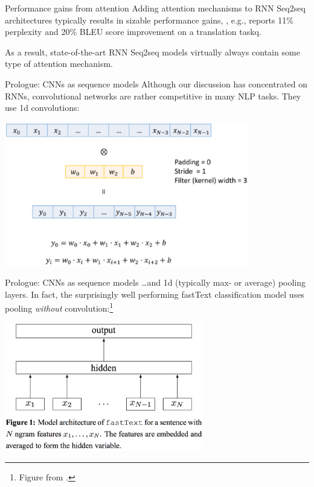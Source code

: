 \documentclass[style=upen, size=14pt]{powerdot}
\newcommand{\gold}{\color{arany}}
\theoremstyle{definition}
\begin{document}
\begin{slide}[toc=]{Performance gains from attention} Adding attention
  mechanisms to RNN Seq2seq architectures typically results in sizable
  performance gains, \citet[63]{luong2016neural}, e.g., reports 11\% perplexity
  and 20\% BLEU score improvement on a translation taskq.\bigskip

  As a result, state-of-the-art RNN Seq2seq models virtually always contain some
  type of attention mechanism.
\end{slide}

\begin{slide}[toc=CNNs]{Prologue: CNNs as sequence models}
  Although our discussion has concentrated on RNNs, {\gold convolutional
    networks} are rather competitive in many NLP tasks. They use 1d
  convolutions:
  \begin{center}
    \includegraphics[width=0.8\textwidth]{figures/1d_conv.eps}
  \end{center}
\end{slide}

\begin{slide}[toc=]{Prologue: CNNs as sequence models}
  \dots and 1d (typically max- or average) pooling layers. In fact, the surprisingly
  well performing {\gold fastText} classification model uses pooling
  \emph{without} convolution:\footnote{Figure from \cite{joulin2016bag}.}
  \begin{center}
    \includegraphics[width=0.65\textwidth]{figures/fastext.eps}
  \end{center}
\end{slide}
\end{document}
